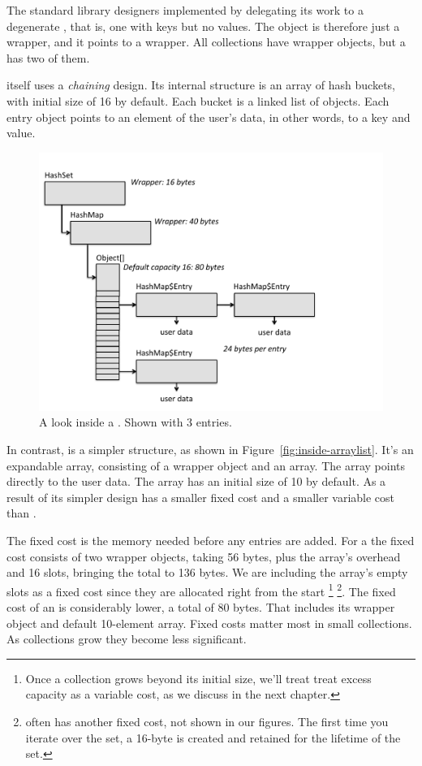 The standard library designers implemented
 by delegating its work to a degenerate ,
that is, one with keys but no values.
The  object is therefore just a wrapper, and it points to a
 wrapper. All collections have
wrapper objects, but a  has two of them. 

 itself uses a \emph{chaining}
design. Its internal structure is an array of hash buckets, with initial size of
16 by default.  Each bucket is a linked
list of  objects. Each entry object
points to an element of the user's data, in other words, to a key and value.

 \begin{figure}
  \centering
 \includegraphics[width=.80\textwidth]{part1/Figures/collections/inside-hashset.pdf}
  \caption{A look inside a . Shown with 3
  entries.}
  \label{fig:inside-hashset}
\end{figure}

In contrast,  is a simpler structure, as shown in
Figure~\ref{fig:inside-arraylist}. It's an expandable array,
consisting of a wrapper object and an array.  The array points directly to the
user data. The array has an initial size of 10 by default.  As a result of its
simpler design  has a smaller fixed cost and a smaller
variable cost than .

The fixed cost is the memory needed before any entries are added.
For a  the fixed cost consists of two wrapper objects, taking 56 bytes, plus
the array's \jre overhead and 16 slots, bringing the total to 136 bytes. We are including the
array's empty slots as a fixed cost since they are allocated right from the start
\footnote{Once a collection grows beyond its initial size, we'll treat
treat excess capacity as a variable cost, as we discuss in the next chapter.
}
\footnote{ often has another
fixed cost, not shown in our figures.  The first time you iterate over
the set, a 16-byte  is created and retained for the lifetime of
the set.}.
The fixed cost of an  is considerably
lower, a total of 80 bytes. That includes its wrapper object and default
10-element array. Fixed costs matter most in
small collections. As collections grow they become less significant.

